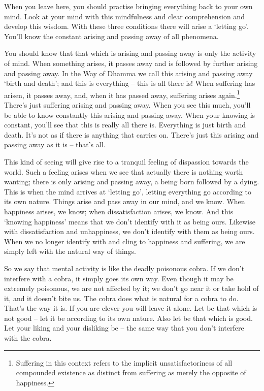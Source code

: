 When you leave here, you should practise bringing everything back to your own mind. Look at your mind with this mindfulness and clear comprehension and develop this wisdom. With these three conditions there will arise a `letting go'. You'll know the constant arising and passing away of all phenomena.

You should know that that which is arising and passing away is only the activity of mind. When something arises, it passes away and is followed by further arising and passing away. In the Way of Dhamma we call this arising and passing away `birth and death'; and this is everything -- this is all there is! When suffering has arisen, it passes away, and, when it has passed away, suffering arises again.\footnote{Suffering in this context refers to the implicit unsatisfactoriness of all compounded existence as distinct from suffering as merely the opposite of happiness.} There's just suffering arising and passing away. When you see this much, you'll be able to know constantly this arising and passing away. When your knowing is constant, you'll see that this is really all there is. Everything is just birth and death. It's not as if there is anything that carries on. There's just this arising and passing away as it is -- that's all.

This kind of seeing will give rise to a tranquil feeling of dispassion towards the world. Such a feeling arises when we see that actually there is nothing worth wanting; there is only arising and passing away, a being born followed by a dying. This is when the mind arrives at `letting go', letting everything go according to its own nature. Things arise and pass away in our mind, and we know. When happiness arises, we know; when dissatisfaction arises, we know. And this `knowing happiness' means that we don't identify with it as being ours. Likewise with dissatisfaction and unhappiness, we don't identify with them as being ours. When we no longer identify with and cling to happiness and suffering, we are simply left with the natural way of things.

So we say that mental activity is like the deadly poisonous cobra. If we don't interfere with a cobra, it simply goes its own way. Even though it may be extremely poisonous, we are not affected by it; we don't go near it or take hold of it, and it doesn't bite us. The cobra does what is natural for a cobra to do. That's the way it is. If you are clever you will leave it alone. Let be that which is not good -- let it be according to its own nature. Also let be that which is good. Let your liking and your disliking be -- the same way that you don't interfere with the cobra.

